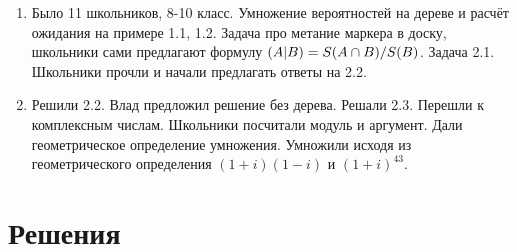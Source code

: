 \documentclass[12pt]{article}
\let\P\relax
\DeclareMathOperator{\P}{\mathbb{P}}
\newcounter{problem}[section]
\theoremstyle{definition}
\begin{document}
\begin{enumerate}
  \item Было 11 школьников, 8-10 класс. Умножение вероятностей на дереве и расчёт ожидания на примере 1.1, 1.2.
  Задача про метание маркера в доску, школьники сами предлагают формулу $\P(A|B) = S(A\cap B) / S(B)$. Задача 2.1.
  Школьники прочли и начали предлагать ответы на 2.2.
  \item Решили 2.2. Влад предложил решение без дерева. Решали 2.3.
  Перешли к комплексным числам. Школьники посчитали модуль и аргумент.
  Дали геометрическое определение умножения. Умножили исходя
  из геометрического определения $(1+i)(1-i)$ и $(1+i)^{43}$.
\end{enumerate}




\renewenvironment{solution}[1]{%
         \vskip .5cm plus 2cm minus 0.1cm%
         {\bfseries \hyperlink{problem:#1}{#1.}}%
}%
{%
}%


\section{Решения}

\end{document}
